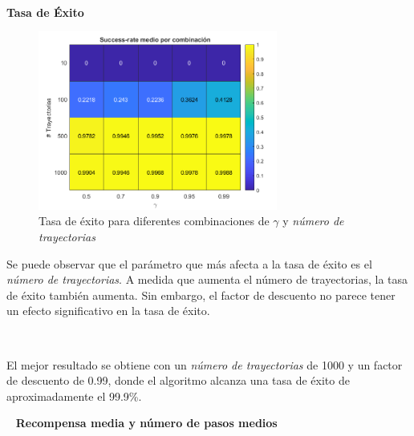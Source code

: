 \

\textbf{Tasa de Éxito}

\begin{figure}[H]
    \centering
    \includegraphics[width=0.7\textwidth]{../../experiments/directEstimation/experiment-1/results/success.png}
    \caption{Tasa de éxito para diferentes combinaciones de $\gamma$ y \textit{número de trayectorias}}
    \label{fig:directEstimation1-success}
\end{figure}

Se puede observar que el parámetro que más afecta a la tasa de éxito es el \textit{número de trayectorias}. A medida que aumenta el número de trayectorias, la tasa de éxito también aumenta. Sin embargo, el factor de descuento no parece tener un efecto significativo en la tasa de éxito.

\

El mejor resultado se obtiene con un \textit{número de trayectorias} de 1000 y un factor de descuento de 0.99, donde el algoritmo alcanza una tasa de éxito de aproximadamente el 99.9\%.

\
\newpage
\textbf{Recompensa media y número de pasos medios}

